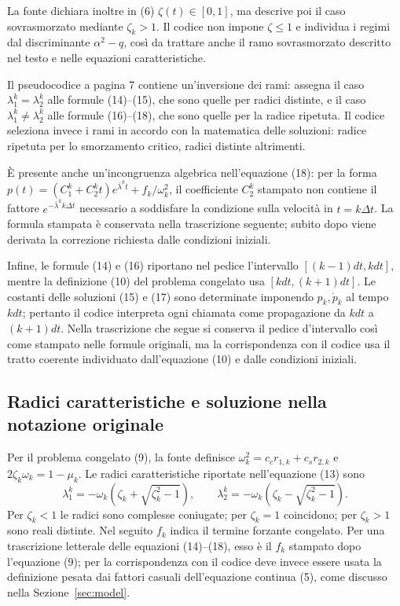 La fonte dichiara inoltre in (6) $\zeta(t)\in[0,1]$, ma descrive poi il caso sovrasmorzato mediante $\zeta_k>1$. Il codice non impone $\zeta\leq1$ e individua i regimi dal discriminante $\alpha^2-q$, così da trattare anche il ramo sovrasmorzato descritto nel testo e nelle equazioni caratteristiche.

Il pseudocodice a pagina 7 contiene un'inversione dei rami: assegna il caso $\lambda_1^k=\lambda_2^k$ alle formule (14)--(15), che sono quelle per radici distinte, e il caso $\lambda_1^k\ne\lambda_2^k$ alle formule (16)--(18), che sono quelle per la radice ripetuta. Il codice seleziona invece i rami in accordo con la matematica delle soluzioni: radice ripetuta per lo smorzamento critico, radici distinte altrimenti.

È presente anche un'incongruenza algebrica nell'equazione (18): per la forma $p(t)=(C_1^k+C_2^k t)e^{\bar\lambda^k t}+f_k/\omega_k^2$, il coefficiente $C_2^k$ stampato non contiene il fattore $e^{-\bar\lambda^k k\Delta t}$ necessario a soddisfare la condizione sulla velocità in $t=k\Delta t$. La formula stampata è conservata nella trascrizione seguente; subito dopo viene derivata la correzione richiesta dalle condizioni iniziali.

Infine, le formule (14) e (16) riportano nel pedice l'intervallo $[(k-1)dt,kdt]$, mentre la definizione (10) del problema congelato usa $[kdt,(k+1)dt]$. Le costanti delle soluzioni (15) e (17) sono determinate imponendo $p_k,\dot p_k$ al tempo $kdt$; pertanto il codice interpreta ogni chiamata come propagazione da $kdt$ a $(k+1)dt$. Nella trascrizione che segue si conserva il pedice d'intervallo così come stampato nelle formule originali, ma la corrispondenza con il codice usa il tratto coerente individuato dall'equazione (10) e dalle condizioni iniziali.

\subsection{Radici caratteristiche e soluzione nella notazione originale}

Per il problema congelato (9), la fonte definisce $\omega_k^2=c_c r_{1,k}+c_s r_{2,k}$ e $2\zeta_k\omega_k=1-\mu_k$. Le radici caratteristiche riportate nell'equazione (13) sono
\begin{equation}
 \lambda_1^k=-\omega_k\left(\zeta_k+\sqrt{\zeta_k^2-1}\right),
 \qquad
 \lambda_2^k=-\omega_k\left(\zeta_k-\sqrt{\zeta_k^2-1}\right).
 \label{eq:or-source-roots}
\end{equation}
Per $\zeta_k<1$ le radici sono complesse coniugate; per $\zeta_k=1$ coincidono; per $\zeta_k>1$ sono reali distinte. Nel seguito $f_k$ indica il termine forzante congelato. Per una trascrizione letterale delle equazioni (14)--(18), esso è il $f_k$ stampato dopo l'equazione (9); per la corrispondenza con il codice deve invece essere usata la definizione pesata dai fattori casuali dell'equazione continua (5), come discusso nella Sezione~\ref{sec:model}.

